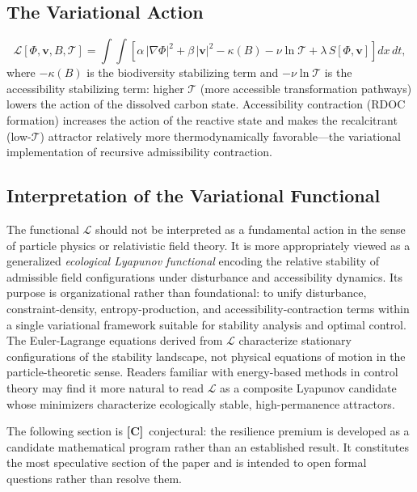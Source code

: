 \documentclass[12pt]{article}
\newcommand{\Lcal}{\mathcal{L}}
\newcommand{\Tcal}{\mathcal{T}}
\begin{document}
\subsection{The Variational Action}

\begin{equation}
\label{eq:action}
\Lcal[\Phi,\mathbf{v},B,\Tcal]
= \int\!\!\int\left[
\alpha\,|\nabla\Phi|^2
+ \beta\,|\mathbf{v}|^2
- \kappa(B)
- \nu\ln\Tcal
+ \lambda\,S[\Phi,\mathbf{v}]
\right]dx\,dt,
\end{equation}
where $-\kappa(B)$ is the biodiversity stabilizing term and $-\nu\ln\Tcal$ is the
accessibility stabilizing term: higher $\Tcal$ (more accessible transformation pathways)
lowers the action of the dissolved carbon state. Accessibility contraction (RDOC
formation) increases the action of the reactive state and makes the recalcitrant
(low-$\Tcal$) attractor relatively more thermodynamically favorable---the variational
implementation of recursive admissibility contraction.

\subsection{Interpretation of the Variational Functional}

The functional $\Lcal$ should not be interpreted as a fundamental action in the sense of
particle physics or relativistic field theory. It is more appropriately viewed as a
generalized \emph{ecological Lyapunov functional} encoding the relative stability of
admissible field configurations under disturbance and accessibility dynamics. Its
purpose is organizational rather than foundational: to unify disturbance, constraint-density,
entropy-production, and accessibility-contraction terms within a single variational
framework suitable for stability analysis and optimal control. The Euler-Lagrange
equations derived from $\Lcal$ characterize stationary configurations of the stability
landscape, not physical equations of motion in the particle-theoretic sense. Readers
familiar with energy-based methods in control theory may find it more natural to read
$\Lcal$ as a composite Lyapunov candidate whose minimizers characterize ecologically
stable, high-permanence attractors.

The following section is \textbf{[C]}~conjectural: the resilience premium is developed
as a candidate mathematical program rather than an established result. It constitutes
the most speculative section of the paper and is intended to open formal questions rather
than resolve them.
\end{document}
